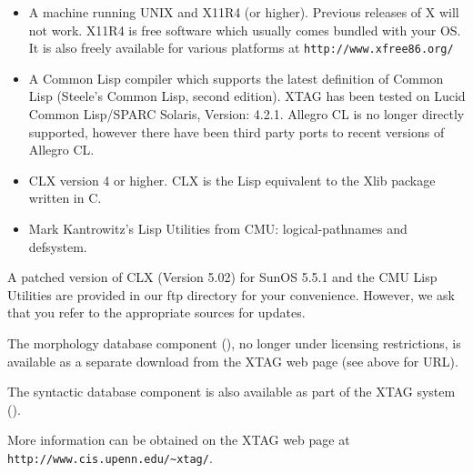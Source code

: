 \begin{itemize}
  
\item A machine running UNIX and X11R4 (or higher). Previous releases
  of X will not work. X11R4 is free software which usually comes
  bundled with your OS. It is also freely available for various
  platforms at {\tt http://www.xfree86.org/}
  
\item A Common Lisp compiler which supports the latest definition of
  Common Lisp (Steele's Common Lisp, second edition). XTAG has been
  tested on Lucid Common Lisp/SPARC Solaris, Version: 4.2.1. Allegro
  CL is no longer directly supported, however there have been third
  party ports to recent versions of Allegro CL.
  
\item CLX version 4 or higher. CLX is the Lisp equivalent to the Xlib
  package written in C.
  
\item Mark Kantrowitz's Lisp Utilities from CMU: logical-pathnames and
  defsystem.

\end{itemize}

A patched version of CLX (Version 5.02) for SunOS 5.5.1 and the CMU
Lisp Utilities are provided in our ftp directory for your convenience.
However, we ask that you refer to the appropriate sources for updates.

The morphology database component (\cite{karp92}), no longer under
licensing restrictions, is available as a separate download from the
XTAG web page (see above for URL).

The syntactic database component is also available as part of the XTAG
system (\cite{EgediMartin94}). 

More information can be obtained on the XTAG web page at \\
{\tt http://www.cis.upenn.edu/\~{}xtag/}.


